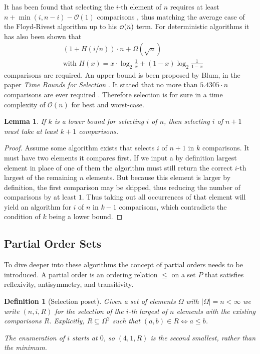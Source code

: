 \documentclass[10pt,journal,compsoc]{IEEEtran}
\newcommand\smallO{
  \mathchoice
    {{\scriptstyle\mathcal{O}}}%
    {{\scriptstyle\mathcal{O}}}%
    {{\scriptscriptstyle\mathcal{O}}}%
    {\scalebox{.50}{$\scriptscriptstyle\mathcal{O}$}}%
  }
\newtheorem{lemma}{Lemma}
\newtheorem{definition}{Definition}
\begin{document}
It has been found that selecting the $i$-th element of $n$ requires at least $n+\min(i,n-i)-\mathcal{O}(1)$ comparisons , thus matching the average case of the Floyd-Rivest algorithm up to his $\smallO(n)$ term.
For deterministic algorithms it has also been shown that
\begin{eqnarray*}
  &\left (1 + H(i/n) \right ) \cdot n + \Omega(\sqrt n) \\
  &\text{with~} H(x) = x \cdot \log_2 \frac{1}{x} + (1-x) \log_2 \frac{1}{1-x}
\end{eqnarray*}
comparisons are required.
An upper bound is been proposed by Blum, in the paper \textit{Time Bounds for Selection} \cite{Blum1972}.
It stated that no more than $5.430\dot{5} \cdot n$ comparisons are ever required .
Therefore selection is for sure in a time complexity of $\mathcal{O}(n)$ for best and worst-case.

\begin{lemma}
  If $k$ is a lower bound for selecting $i$ of $n$, then selecting $i$ of $n + 1$ must take at least $k + 1$ comparisons.
\end{lemma}

\begin{proof}
  Assume some algorithm exists that selects $i$ of $n + 1$ in $k$ comparisons.
  It must have two elements it compares first.
  If we input a by definition largest element in place of one of them the algorithm must still return the correct $i$-th largest of the remaining $n$ elements.
  But because this element is larger by definition, the first comparison may be skipped, thus reducing the number of comparisons by at least $1$.
  Thus taking out all occurrences of that element will yield an algorithm for $i$ of $n$ in $k - 1$ comparisons, which contradicts the condition of $k$ being a lower bound.
\end{proof}

\subsection{Partial Order Sets}
To dive deeper into these algorithms the concept of partial orders needs to be introduced.
A partial order is an ordering relation $\leq$ on a set $P$ that satisfies reflexivity, antisymmetry, and transitivity.

\begin{definition}[Selection poset]
  Given a set of elements $\Omega$ with $|\Omega| = n < \infty$ we write $(n, i, R)$ for the selection of the $i$-th largest of $n$ elements with the existing comparisons $R$.
  Explicitly, $R\subseteq\Omega^2$ such that $(a, b)\in R \Longleftrightarrow a \leq b$.

  The enumeration of $i$ starts at $0$, so $(4, 1, R)$ is the second smallest, rather than the minimum.
\end{definition}
\end{document}
